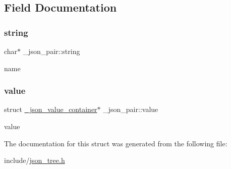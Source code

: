 \subsection{Field Documentation}
\mbox{\label{struct__json__pair_ad599f0ce62f57e7465046444953b6275}} 
\subsubsection{\texorpdfstring{string}{string}}
{\footnotesize\ttfamily char$\ast$ \+\_\+json\+\_\+pair\+::string}

name \mbox{\label{struct__json__pair_a70e763b09977d01bdc56afc59fd44989}} 
\subsubsection{\texorpdfstring{value}{value}}
{\footnotesize\ttfamily struct \hyperlink{struct__json__value__container}{\+\_\+json\+\_\+value\+\_\+container}$\ast$ \+\_\+json\+\_\+pair\+::value}

value 

The documentation for this struct was generated from the following file\+:\begin{DoxyCompactItemize}
\item 
include/\hyperlink{json__tree_8h}{json\+\_\+tree.\+h}\end{DoxyCompactItemize}
